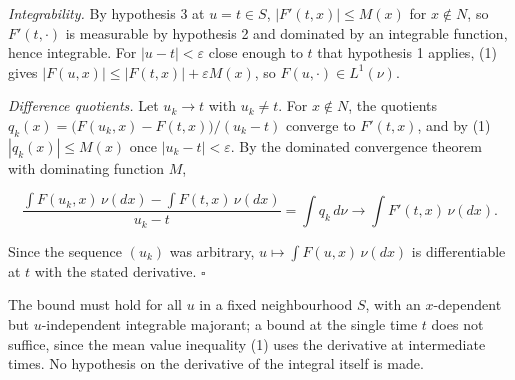 \documentclass[11pt,a4paper]{report}
\begin{document}
\emph{Integrability.} By hypothesis 3 at \(u=t\in S\), \(|F'(t,x)|\le M(x)\) for \(x\notin N\), so \(F'(t,\cdot)\) is measurable by hypothesis 2 and dominated by an integrable function, hence integrable. For \(|u-t|<\varepsilon\) close enough to \(t\) that hypothesis 1 applies, (1) gives \(|F(u,x)|\le|F(t,x)|+\varepsilon M(x)\), so \(F(u,\cdot)\in L^1(\nu)\).




\emph{Difference quotients.} Let \(u_k\to t\) with \(u_k\neq t\). For \(x\notin N\), the quotients \(q_k(x)=\bigl(F(u_k,x)-F(t,x)\bigr)/(u_k-t)\) converge to \(F'(t,x)\), and by (1) \(|q_k(x)|\le M(x)\) once \(|u_k-t|<\varepsilon\). By the dominated convergence theorem with dominating function \(M\),


\[\frac{\int F(u_k,x)\,\nu(dx)-\int F(t,x)\,\nu(dx)}{u_k-t}=\int q_k\,d\nu\longrightarrow\int F'(t,x)\,\nu(dx).\]


Since the sequence \((u_k)\) was arbitrary, \(u\mapsto\int F(u,x)\,\nu(dx)\) is differentiable at \(t\) with the stated derivative. \(\square\)




The bound must hold for all \(u\) in a fixed neighbourhood \(S\), with an \(x\)-dependent but \(u\)-independent integrable majorant; a bound at the single time \(t\) does not suffice, since the mean value inequality (1) uses the derivative at intermediate times. No hypothesis on the derivative of the integral itself is made.
\end{document}
